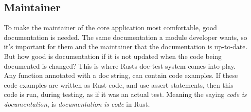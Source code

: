 \subsection{Maintainer}

To make the maintainer of the core application most comfortable, good
documentation is needed. The same documentation a module developer wants, so
it's important for them and the maintainer that the documentation is up-to-date.
But how good is documentation if it is not updated when the code being
documented is changed? This is where Rusts doc-test system comes into play. Any
function annotated with a doc string, can contain code examples. If these code
examples are written as Rust code, and use assert statements, then this code is
run, during testing, as if it was an actual test. Meaning the saying
\textit{code is documentation}, is \textit{documentation is code} in Rust.

